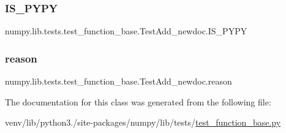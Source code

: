 \subsubsection{\texorpdfstring{I\+S\+\_\+\+P\+Y\+PY}{IS\_PYPY}}
{\footnotesize\ttfamily numpy.\+lib.\+tests.\+test\+\_\+function\+\_\+base.\+Test\+Add\+\_\+newdoc.\+I\+S\+\_\+\+P\+Y\+PY\hspace{0.3cm}{\ttfamily [static]}}

\mbox{\label{classnumpy_1_1lib_1_1tests_1_1test__function__base_1_1TestAdd__newdoc_a7e33f2eb0bbc5631cd4bad4cf4866a34}} 
\subsubsection{\texorpdfstring{reason}{reason}}
{\footnotesize\ttfamily numpy.\+lib.\+tests.\+test\+\_\+function\+\_\+base.\+Test\+Add\+\_\+newdoc.\+reason\hspace{0.3cm}{\ttfamily [static]}}



The documentation for this class was generated from the following file\+:\begin{DoxyCompactItemize}
\item 
venv/lib/python3./site-\/packages/numpy/lib/tests/\hyperlink{lib_2tests_2test__function__base_8py}{test\+\_\+function\+\_\+base.\+py}\end{DoxyCompactItemize}
